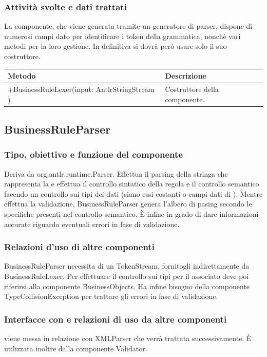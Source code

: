 \documentclass[11pt,titlepage,a4paper]{report}
\begin{document}
\subsubsection{Attivit\`a svolte e dati trattati}
La componente, che viene generata tramite un generatore di parser, dispone di numerosi campi dato per identificare i token della grammatica, nonch\`e vari metodi per la loro gestione. In definitiva si dovr\`a per\`o usare solo il suo costruttore.
\begin{center}
\begin{tabular}{||p{6cm}||p{6cm}||} \hline
\hline
Metodo & Descrizione \\  \hline
+BusinessRuleLexer(input: AntlrStringStream ) & Costruttore della componente.\\ \hline
\end{tabular}
\end{center}

\subsection{BusinessRuleParser}
\subsubsection{Tipo, obiettivo e funzione del componente}
Deriva da org.antlr.runtime.Parser. Effettua il parsing della stringa che rappresenta la \br e effettua il controllo sintatico della regola e il controllo semantico facendo un controllo sui tipi dei dati (siano essi costanti o campi dati di \bos). Mentre effettua la validazione, BusinessRuleParser genera l'albero di pasing secondo le specifiche presenti nel controllo semantico. \`E infine in grado di dare informazioni accurate 
riguardo eventuali errori in fase di validazione.
\subsubsection{Relazioni d'uso di altre componenti}
BusinessRuleParser necessita di un TokenStream, fornitogli indirettamente da BusinessRuleLexer. Per effettuare il controllo sui tipi per il \bo associato deve poi riferirsi alla componente BusinessObjects. Ha infine bisogno della componente TypeCollisionException per trattare gli errori in fase di validazione.
\subsubsection{Interfacce con e relazioni di uso da altre componenti}
\brp viene messa in relazione con XMLParser che verr\`a trattata successivamente. \`E utilizzata inoltre dalla componente Validator.
\end{document}
